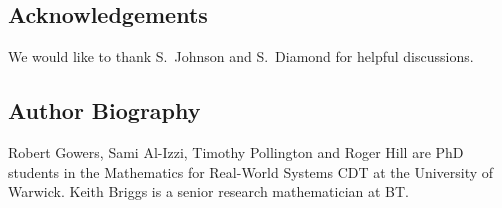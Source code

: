 \documentclass[twocolumn,secnumarabic,amssymb, nobibnotes, aps, prl,superscriptaddress]{revtex4-1}
\begin{document}
\subsection*{Acknowledgements}
We would like to thank S.~Johnson and S.~Diamond for helpful discussions. 

\subsection*{Author Biography}
Robert Gowers, Sami Al-Izzi, Timothy Pollington and Roger Hill are PhD students in the Mathematics for Real-World Systems CDT at the University of Warwick.  Keith Briggs is a senior research mathematician at BT.

\vspace{0.2cm}
 


\end{document}
